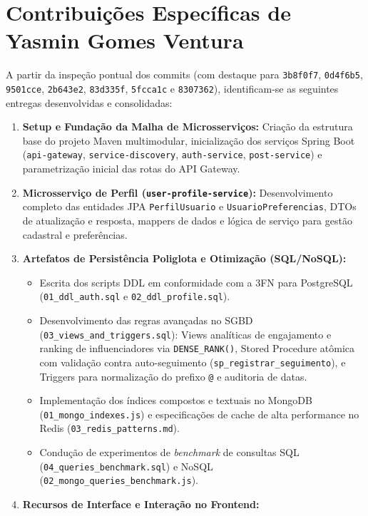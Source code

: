 \documentclass[12pt,a4paper]{report}
\begin{document}
\section{Contribuições Específicas de Yasmin Gomes Ventura}
A partir da inspeção pontual dos commits (com destaque para \texttt{3b8f0f7}, \texttt{0d4f6b5}, \texttt{9501cce}, \texttt{2b643e2}, \texttt{83d335f}, \texttt{5fcca1c} e \texttt{8307362}), identificam-se as seguintes entregas desenvolvidas e consolidadas:

\begin{enumerate}
    \item \textbf{Setup e Fundação da Malha de Microsserviços:} Criação da estrutura base do projeto Maven multimodular, inicialização dos serviços Spring Boot (\texttt{api-gateway}, \texttt{service-discovery}, \texttt{auth-service}, \texttt{post-service}) e parametrização inicial das rotas do API Gateway.
    \item \textbf{Microsserviço de Perfil (\texttt{user-profile-service}):} Desenvolvimento completo das entidades JPA \texttt{PerfilUsuario} e \texttt{UsuarioPreferencias}, DTOs de atualização e resposta, mappers de dados e lógica de serviço para gestão cadastral e preferências.
    \item \textbf{Artefatos de Persistência Poliglota e Otimização (SQL/NoSQL):}
    \begin{itemize}
        \item Escrita dos scripts DDL em conformidade com a 3FN para PostgreSQL (\texttt{01\_ddl\_auth.sql} e \texttt{02\_ddl\_profile.sql}).
        \item Desenvolvimento das regras avançadas no SGBD (\texttt{03\_views\_and\_triggers.sql}): Views analíticas de engajamento e ranking de influenciadores via \texttt{DENSE\_RANK()}, Stored Procedure atômica com validação contra auto-seguimento (\texttt{sp\_registrar\_seguimento}), e Triggers para normalização do prefixo \texttt{@} e auditoria de datas.
        \item Implementação dos índices compostos e textuais no MongoDB (\texttt{01\_mongo\_indexes.js}) e especificações de cache de alta performance no Redis (\texttt{03\_redis\_patterns.md}).
        \item Condução de experimentos de \textit{benchmark} de consultas SQL (\texttt{04\_queries\_benchmark.sql}) e NoSQL (\texttt{02\_mongo\_queries\_benchmark.js}).
    \end{itemize}
    \item \textbf{Recursos de Interface e Interação no Frontend:}

\end{enumerate}
\end{document}
